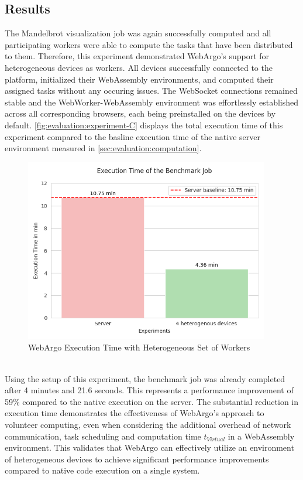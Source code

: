 \subsection{Results}
The Mandelbrot visualization job was again successfully computed and all participating workers were able to compute the tasks that have been distributed to them. Therefore, this experiment demonstrated WebArgo's support for heterogeneous devices as workers. All devices successfully connected to the platform, initialized their WebAssembly environments, and computed their assigned tasks without any occuring issues. The WebSocket connections remained stable and the WebWorker-WebAssembly environment was effortlessly established across all corresponding browsers, each being preinstalled on the devices by default. \autoref{fig:evaluation:experiment-C} displays the total execution time of this experiment compared to the basline execution time of the native server environment measured in \autoref{sec:evaluation:computation}.
\begin{figure}[htbp]
    \centering
    \includegraphics[width=0.95\textwidth]{gfx/figures/Evaluation_C.png}
    \caption{WebArgo Execution Time with Heterogeneous Set of Workers}
    \label{fig:evaluation:experiment-C}
\end{figure}
~\\
Using the setup of this experiment, the benchmark job was already completed after 4 minutes and 21.6 seconds. This represents a performance improvement of 59\% compared to the native execution on the server. The substantial reduction in execution time demonstrates the effectiveness of WebArgo's approach to volunteer computing, even when considering the additional overhead of network communication, task scheduling and computation time $t_{Virtual}$ in a WebAssembly environment. This validates that WebArgo can effectively utilize an environment of heterogeneous devices to achieve significant performance improvements compared to native code execution on a  single system.
